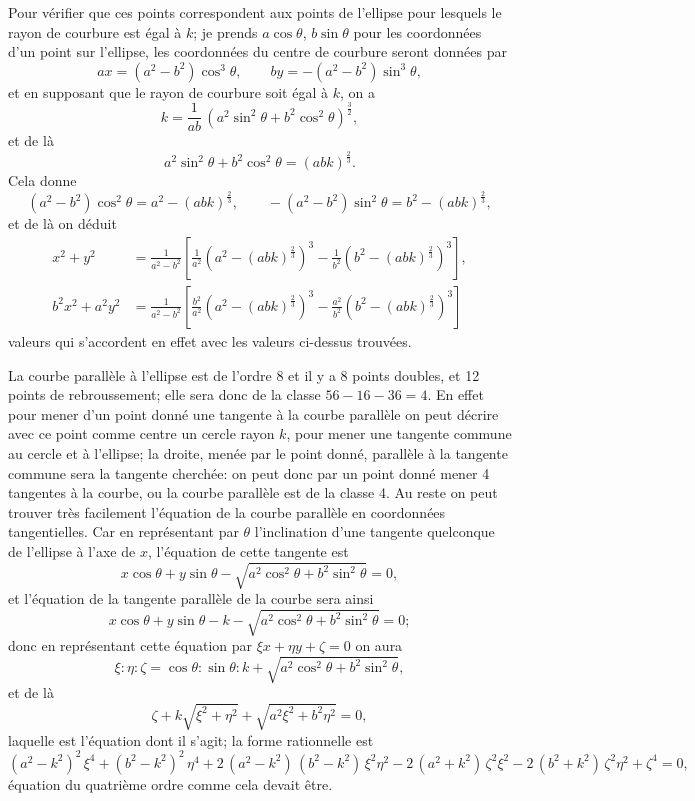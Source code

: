\documentclass[11pt,a4paper]{book}
\begin{document}
Pour v\'{e}rifier que ces points correspondent aux points de l'ellipse pour lesquels le rayon de courbure est \'{e}gal \`{a} $k$; je prends $a\cos\theta$, $b\sin\theta$ pour les coordonn\'{e}es d'un point sur l'ellipse, les coordonn\'{e}es du centre de courbure seront donn\'{e}es par
\[
ax = (a^2-b^2)\cos^3\theta, \qquad by = -(a^2-b^2)\sin^3\theta,
\]
et en supposant que le rayon de courbure soit \'{e}gal \`{a} $k$, on a
\[
k = \frac{1}{ab}\,(a^2\sin^2\theta + b^2\cos^2\theta)^{\frac{3}{2}},
\]
et de l\`{a}
\[
a^2\sin^2\theta + b^2\cos^2\theta = (abk)^{\frac{2}{3}}.
\]
Cela donne
\[
(a^2-b^2)\cos^2\theta = a^2 - (abk)^{\frac{2}{3}}, \qquad -(a^2-b^2)\sin^2\theta = b^2 - (abk)^{\frac{2}{3}},
\]
et de l\`{a} on d\'{e}duit
\begin{align*}
x^2 + y^2 &= \frac{1}{a^2-b^2}\left[\frac{1}{a^2}\left(a^2-(abk)^{\frac{2}{3}}\right)^3 - \frac{1}{b^2}\left(b^2-(abk)^{\frac{2}{3}}\right)^3\right], \\
b^2x^2 + a^2y^2 &= \frac{1}{a^2-b^2}\left[\frac{b^2}{a^2}\left(a^2-(abk)^{\frac{2}{3}}\right)^3 - \frac{a^2}{b^2}\left(b^2-(abk)^{\frac{2}{3}}\right)^3\right]
\end{align*}
valeurs qui s'accordent en effet avec les valeurs ci-dessus trouv\'{e}es.

\newpage
La courbe parall\`{e}le \`{a} l'ellipse est de l'ordre 8 et il y a 8 points doubles, et 12 points de rebroussement; elle sera donc de la classe $56 - 16 - 36 = 4$. En effet pour mener d'un point donn\'{e} une tangente \`{a} la courbe parall\`{e}le on peut d\'{e}crire avec ce point comme centre un cercle rayon $k$, pour mener une tangente commune au cercle et \`{a} l'ellipse; la droite, men\'{e}e par le point donn\'{e}, parall\`{e}le \`{a} la tangente commune sera la tangente cherch\'{e}e: on peut donc par un point donn\'{e} mener 4 tangentes \`{a} la courbe, ou la courbe parall\`{e}le est de la classe 4. Au reste on peut trouver tr\`{e}s facilement l'\'{e}quation de la courbe parall\`{e}le en coordonn\'{e}es tangentielles. Car en repr\'{e}sentant par $\theta$ l'inclination d'une tangente quelconque de l'ellipse \`{a} l'axe de $x$, l'\'{e}quation de cette tangente est
\[
x\cos\theta + y\sin\theta - \sqrt{a^2\cos^2\theta + b^2\sin^2\theta} = 0,
\]
et l'\'{e}quation de la tangente parall\`{e}le de la courbe sera ainsi
\[
x\cos\theta + y\sin\theta - k - \sqrt{a^2\cos^2\theta + b^2\sin^2\theta} = 0;
\]
donc en repr\'{e}sentant cette \'{e}quation par $\xi x + \eta y + \zeta = 0$ on aura
\[
\xi : \eta : \zeta = \cos\theta : \sin\theta : k + \sqrt{a^2\cos^2\theta + b^2\sin^2\theta},
\]
et de l\`{a}
\[
\zeta + k\sqrt{\xi^2+\eta^2} + \sqrt{a^2\xi^2+b^2\eta^2} = 0,
\]
laquelle est l'\'{e}quation dont il s'agit; la forme rationnelle est
\[
(a^2-k^2)^2\,\xi^4 + (b^2-k^2)^2\,\eta^4 + 2\,(a^2-k^2)\,(b^2-k^2)\,\xi^2\eta^2 - 2\,(a^2+k^2)\,\zeta^2\xi^2 - 2\,(b^2+k^2)\,\zeta^2\eta^2 + \zeta^4 = 0,
\]
\'{e}quation du quatri\`{e}me ordre comme cela devait \^{e}tre.
\end{document}
